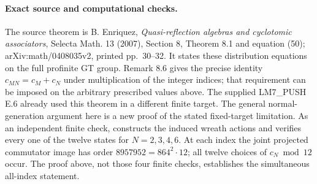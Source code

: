 \paragraph{Exact source and computational checks.}
The source theorem is B. Enriquez, \emph{Quasi-reflection algebras
and cyclotomic associators}, Selecta Math. 13 (2007),
Section 8, Theorem 8.1 and equation (50); arXiv:math/0408035v2,
printed pp.~30--32. It states these distribution equations
on the full profinite GT group. Remark 8.6 gives the precise
identity $c_{MN}=c_M+c_N$ under multiplication of the integer indices; that requirement
can be imposed on the arbitrary prescribed values above.
The supplied LM7\_PUSH E.6 already used this theorem in a
different finite target. The general normal-generation argument
here is a new proof of the stated fixed-target limitation.
As an independent finite check, 
constructs the induced wreath actions and verifies every one of
the twelve states for $N=2,3,4,6$. At each index the joint
projected commutator image has order $8957952=864^2\cdot12$;
all twelve choices of $c_N\bmod12$ occur. The proof above,
not those four finite checks, establishes the simultaneous
all-index statement.
